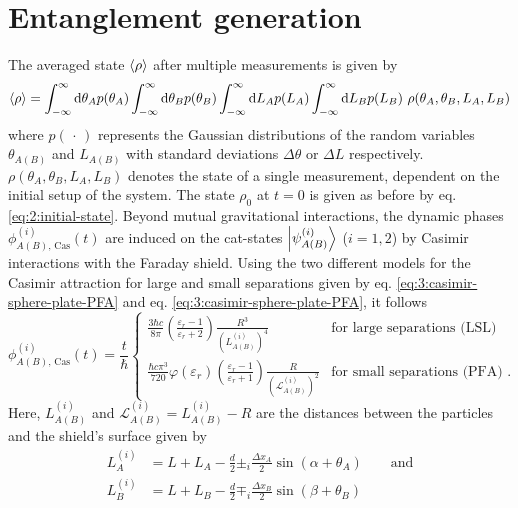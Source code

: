 \section{Entanglement generation}\label{sec:4:entanglement-generation}
The averaged state $\left\langle\rho\right\rangle$ after multiple measurements is given by
\begin{equation}\label{eq:4:average-density}
  \left\langle\rho\right\rangle = \int_{-\infty}^{\infty} \dd \theta_A p(\theta_A) \int_{-\infty}^{\infty} \dd \theta_B p(\theta_B) \int_{-\infty}^{\infty} \dd L_A p(L_A) \int_{-\infty}^{\infty} \dd L_B p(L_B) \ \rho(\theta_A, \theta_B, L_A, L_B)
\end{equation} 
where $p(\,\cdot\,)$ represents the Gaussian distributions of the random variables 
$\theta_{A(B)}$ and $L_{A(B)}$ with standard deviations $\Delta \theta$ or $\Delta L$ respectively. 
$\rho(\theta_A, \theta_B, L_A, L_B)$ denotes the state of a single measurement, dependent on the initial setup of the system.
The state $\rho_0$ at $t=0$ is given as before by eq. \eqref{eq:2:initial-state}.
Beyond mutual gravitational interactions, the dynamic phases $\phi^{(i)}_{A(B),\,\mathrm{Cas}}(t)$ are induced on the cat-states $\ket{\psi^{(i)}_{A(B)}}$ ($i = 1, 2$) by Casimir interactions with the Faraday shield.
Using the two different models for the Casimir attraction for large and small separations given by eq. \eqref{eq:3:casimir-sphere-plate-PFA} and eq. \eqref{eq:3:casimir-sphere-plate-PFA}, it follows
\begin{equation}
  \phi^{(i)}_{A(B),\,\mathrm{Cas}}(t) = \frac{t}{\hbar}
  \begin{cases}
     \frac{3 \hbar c}{8 \pi} \left(\frac{\varepsilon_r - 1}{\varepsilon_r + 2}\right) \frac{R^3}{\left(L^{(i)}_{A(B)}\right)^4} & \text{for large separations (LSL)} \\
    \frac{\hbar c \pi^3}{720} \varphi(\varepsilon_r) \left(\frac{\varepsilon_r - 1}{\varepsilon_r + 1}\right) \frac{R}{\left(\mathscr{L}^{(i)}_{A(B)}\right)^2} & \text{for small separations (PFA) .}
  \end{cases}
\end{equation}
Here, $L^{(i)}_{A(B)}$ and $\mathscr{L}^{(i)}_{A(B)} = L^{(i)}_{A(B)}-R$ are the distances between the particles and the shield's surface given by
\begin{align}\label{eq:4:L-casimir}
  L^{(i)}_{A} &= L + L_{A} - \frac{d}{2} \pm_i \frac{\Delta x_{A}}{2} \sin(\alpha + \theta_{A}) \quad \quad \text{and} \\
  L^{(i)}_{B} &= L + L_{B} - \frac{d}{2} \mp_i \frac{\Delta x_{B}}{2} \sin(\beta + \theta_{B})
\end{align}
